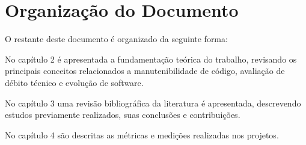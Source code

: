 \section{Organização do Documento}

O restante deste documento é organizado da seguinte forma:


No capítulo 2 é apresentada a fundamentação teórica do trabalho, revisando
os principais conceitos relacionados a manutenibilidade de código, avaliação de débito técnico e evolução de software.

No capítulo 3 uma revisão bibliográfica da literatura é apresentada, descrevendo estudos previamente realizados, suas conclusões e 
contribuições.

No capítulo 4 são descritas as métricas e medições realizadas nos projetos.





